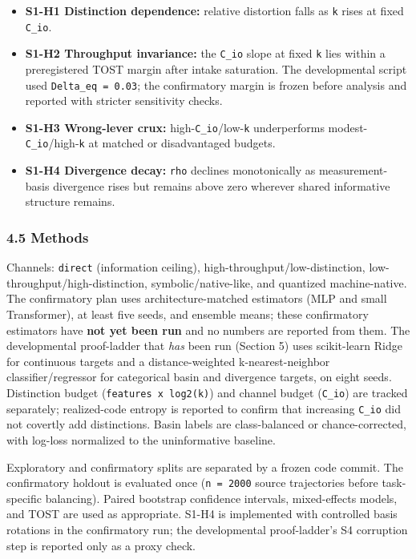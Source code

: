 \documentclass[
  11pt,
]{article}
\providecommand{\tightlist}{%
  \setlength{\itemsep}{0pt}\setlength{\parskip}{0pt}}
\begin{document}
\begin{itemize}
\tightlist
\item
  \textbf{S1-H1 Distinction dependence:} relative
  distortion falls as \texttt{k} rises at fixed
  \texttt{C\_io}.
\item
  \textbf{S1-H2 Throughput invariance:} the
  \texttt{C\_io} slope at fixed \texttt{k} lies within
  a preregistered TOST margin after intake saturation.
  The developmental script used
  \texttt{Delta\_eq\ =\ 0.03}; the confirmatory margin
  is frozen before analysis and reported with stricter
  sensitivity checks.
\item
  \textbf{S1-H3 Wrong-lever crux:}
  high-\texttt{C\_io}/low-\texttt{k} underperforms
  modest-\texttt{C\_io}/high-\texttt{k} at matched or
  disadvantaged budgets.
\item
  \textbf{S1-H4 Divergence decay:} \texttt{rho}
  declines monotonically as measurement-basis
  divergence rises but remains above zero wherever
  shared informative structure remains.
\end{itemize}

\subsubsection{4.5 Methods}\label{methods}

Channels: \texttt{direct} (information ceiling),
high-throughput/low-distinction,
low-throughput/high-distinction, symbolic/native-like,
and quantized machine-native. The confirmatory plan
uses architecture-matched estimators (MLP and small
Transformer), at least five seeds, and ensemble means;
these confirmatory estimators have \textbf{not yet been
run} and no numbers are reported from them. The
developmental proof-ladder that \emph{has} been run
(Section 5) uses scikit-learn Ridge for continuous
targets and a distance-weighted k-nearest-neighbor
classifier/regressor for categorical basin and
divergence targets, on eight seeds. Distinction budget
(\texttt{features\ x\ log2(k)}) and channel budget
(\texttt{C\_io}) are tracked separately; realized-code
entropy is reported to confirm that increasing
\texttt{C\_io} did not covertly add distinctions. Basin
labels are class-balanced or chance-corrected, with
log-loss normalized to the uninformative baseline.

Exploratory and confirmatory splits are separated by a
frozen code commit. The confirmatory holdout is
evaluated once (\texttt{n\ =\ 2000} source trajectories
before task-specific balancing). Paired bootstrap
confidence intervals, mixed-effects models, and TOST
are used as appropriate. S1-H4 is implemented with
controlled basis rotations in the confirmatory run; the
developmental proof-ladder's S4 corruption step is
reported only as a proxy check.
\end{document}
